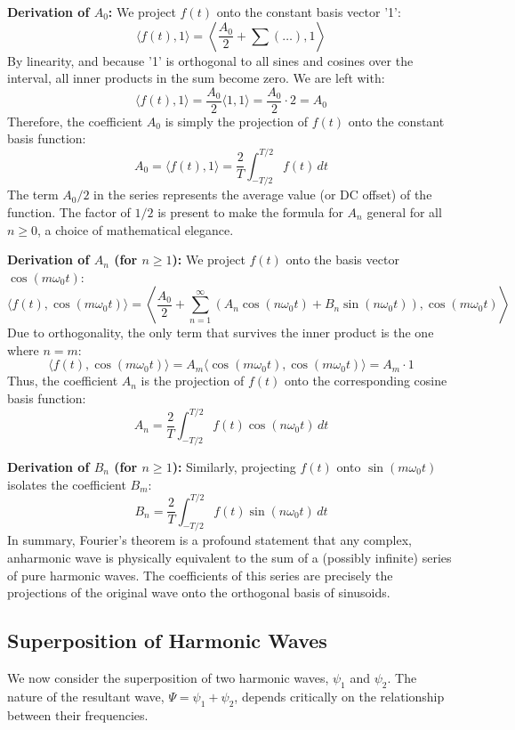 \begin{definition}
\begin{theorem}
\textbf{Derivation of $A_0$:}
We project $f(t)$ onto the constant basis vector '1':
$$ \langle f(t), 1 \rangle = \left\langle \frac{A_0}{2} + \sum (\dots), 1 \right\rangle $$
By linearity, and because '1' is orthogonal to all sines and cosines over the interval, all inner products in the sum become zero. We are left with:
$$ \langle f(t), 1 \rangle = \frac{A_0}{2} \langle 1, 1 \rangle = \frac{A_0}{2} \cdot 2 = A_0 $$
Therefore, the coefficient $A_0$ is simply the projection of $f(t)$ onto the constant basis function:
$$ A_0 = \langle f(t), 1 \rangle = \frac{2}{T} \int_{-T/2}^{T/2} f(t) \,dt $$
The term $A_0/2$ in the series represents the average value (or DC offset) of the function. The factor of $1/2$ is present to make the formula for $A_n$ general for all $n \ge 0$, a choice of mathematical elegance.

\textbf{Derivation of $A_n$ (for $n \ge 1$):}
We project $f(t)$ onto the basis vector $\cos(m\omega_0 t)$:
$$ \langle f(t), \cos(m\omega_0 t) \rangle = \left\langle \frac{A_0}{2} + \sum_{n=1}^\infty (A_n \cos(n\omega_0 t) + B_n \sin(n\omega_0 t)), \cos(m\omega_0 t) \right\rangle $$
Due to orthogonality, the only term that survives the inner product is the one where $n=m$:
$$ \langle f(t), \cos(m\omega_0 t) \rangle = A_m \langle \cos(m\omega_0 t), \cos(m\omega_0 t) \rangle = A_m \cdot 1 $$
Thus, the coefficient $A_n$ is the projection of $f(t)$ onto the corresponding cosine basis function:
$$ A_n = \frac{2}{T} \int_{-T/2}^{T/2} f(t)\cos(n\omega_0 t) \,dt $$

\textbf{Derivation of $B_n$ (for $n \ge 1$):}
Similarly, projecting $f(t)$ onto $\sin(m\omega_0 t)$ isolates the coefficient $B_m$:
$$ B_n = \frac{2}{T} \int_{-T/2}^{T/2} f(t)\sin(n\omega_0 t) \,dt $$
In summary, Fourier's theorem is a profound statement that any complex, anharmonic wave is physically equivalent to the sum of a (possibly infinite) series of pure harmonic waves. The coefficients of this series are precisely the projections of the original wave onto the orthogonal basis of sinusoids.
\end{theorem}

\subsection{Superposition of Harmonic Waves}
We now consider the superposition of two harmonic waves, $\psi_1$ and $\psi_2$. The nature of the resultant wave, $\Psi = \psi_1 + \psi_2$, depends critically on the relationship between their frequencies.


\end{definition}
